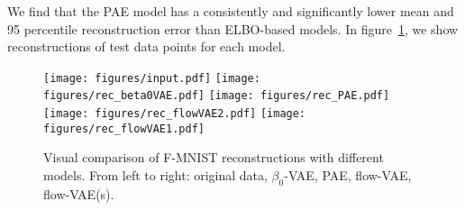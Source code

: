 \documentclass[10pt]{article} \usepackage[accepted]{tmlr}
\begin{document}
We find that the PAE model has a consistently and significantly lower mean and 95 percentile reconstruction error than ELBO-based models. In figure~\ref{fig:reconstructions}, we show reconstructions of test data points for each model. \begin{figure}
\texttt{[image: figures/input.pdf]}
\texttt{[image: figures/rec\_beta0VAE.pdf]}
\texttt{[image: figures/rec\_PAE.pdf]}
\texttt{[image: figures/rec\_flowVAE2.pdf]}
\texttt{[image: figures/rec\_flowVAE1.pdf]}
\caption{Visual comparison of F-MNIST reconstructions with different models. From left to right: original data, $\beta_0$-VAE, PAE, flow-VAE, flow-VAE(s).}
\label{fig:reconstructions}
\end{figure}
\end{document}
